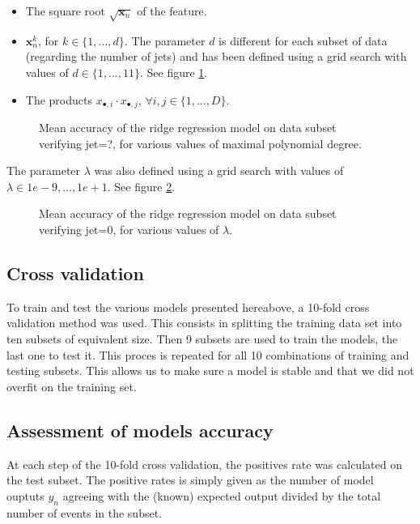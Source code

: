 \documentclass[10pt,conference,compsocconf]{IEEEtran}
\begin{document}
\begin{itemize}
\item The square root $\sqrt{\mathbf{x}_n}$ of the feature.
\item $\mathbf{x}_n^k$, for $k\in \{1, ..., d\}$. The parameter $d$ is different for each subset of data (regarding the number of jets) and has been defined using a grid search with values of $d \in \{1, ..., 11\}$. See figure \ref{jet_2}.
\item The products $x_{\bullet,i}\cdot x_{\bullet,j}$, $\forall i,j \in \{1, ..., D\}$.
\end{itemize}

\begin{figure*}[htp]
\caption{\label{jet_2} Mean accuracy of the ridge regression model on data subset verifying jet=?, for various values of maximal polynomial degree.}
\end{figure*}

The parameter $\lambda$ was also defined using a grid search with values of $\lambda \in {1e-9, ..., 1e+1}$. See figure \ref{jet_0}.

\begin{figure*}[htp]
\caption{\label{jet_0} Mean accuracy of the ridge regression model on data subset verifying jet=0, for various values of $\lambda$.}
\end{figure*}

\subsection{Cross validation}

To train and test the various models presented hereabove, a 10-fold cross validation method was used. This consists in splitting the training data set into ten subsets of equivalent size. Then 9 subsets are used to train the models, the last one to test it. This proces is repeated for all 10 combinations of training and testing subsets. This allows us to make sure a model is stable and that we did not overfit on the training set.

\subsection{Assessment of models accuracy}

At each step of the 10-fold cross validation, the positives rate was calculated on the test subset. The positive rates is simply given as the number of model ouptuts $y_n$ agreeing with the (known) expected output divided by the total number of events in the subset.
\end{document}
